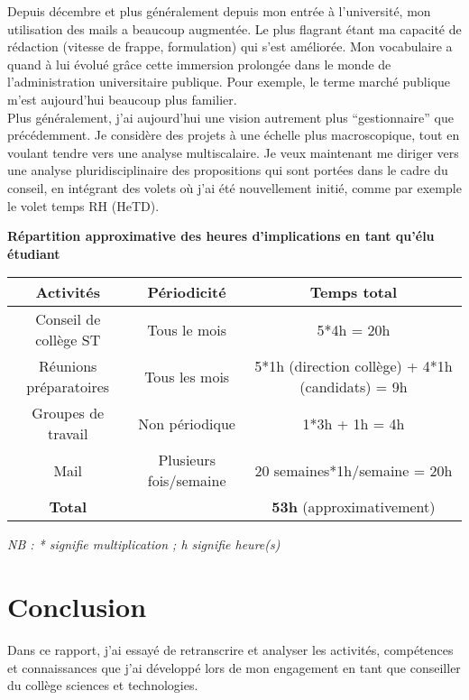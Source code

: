 \documentclass{article}
\begin{document}
Depuis décembre et plus généralement depuis mon entrée à l'université, mon utilisation des mails a beaucoup augmentée. Le plus flagrant étant ma capacité de rédaction (vitesse de frappe, formulation) qui s'est améliorée. Mon vocabulaire a quand à lui évolué grâce cette immersion prolongée dans le monde de l'administration universitaire publique. Pour exemple, le terme marché publique m'est aujourd'hui beaucoup plus familier.\\

Plus généralement, j'ai aujourd'hui une vision autrement plus ``gestionnaire'' que précédemment. Je considère des projets à une échelle plus macroscopique, tout en voulant tendre vers une analyse multiscalaire. Je veux maintenant me diriger vers une analyse pluridisciplinaire des propositions qui sont portées dans le cadre du conseil, en intégrant des volets où j'ai été nouvellement initié, comme par exemple le volet temps RH (HeTD).

\newpage
\begin{center}
\textbf{Répartition approximative des heures d'implications en tant qu'élu étudiant}
\vspace*{10pt}

\begin{tabular}{|c|c|c|}
\hline 
\textbf{Activités} & \textbf{Périodicité} & \textbf{Temps total}\\ 
\hline 
Conseil de collège ST & Tous le mois & 5*4h = 20h \\ 
\hline 
Réunions préparatoires & Tous les mois & 5*1h (direction collège) + 4*1h (candidats) = 9h\\ 
\hline 
Groupes de travail & Non périodique & 1*3h + 1h = 4h\\ 
\hline 
Mail & Plusieurs fois/semaine & 20 semaines*1h/semaine = 20h\\ 
\hline 
\textbf{Total} &  & \textbf{53h} (approximativement) \\ 
\hline 
\end{tabular} 
\end{center}
\textit{NB : * signifie multiplication ; h signifie heure(s)}
	
\section*{Conclusion}
Dans ce rapport, j'ai essayé de retranscrire et analyser les activités, compétences et connaissances que j'ai développé lors de mon engagement en tant que conseiller du collège sciences et technologies.\\
\end{document}
